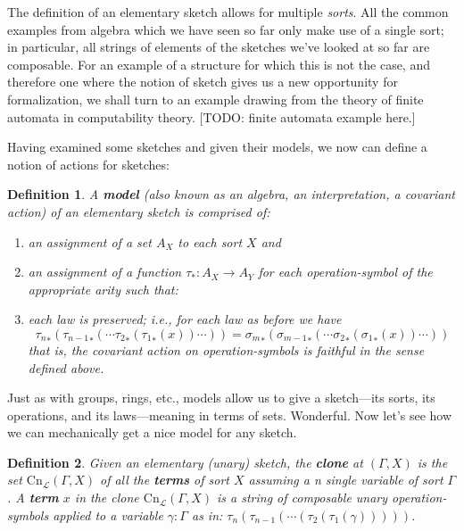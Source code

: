 \documentclass[12pt,twoside]{reedthesis}
\newtheorem{definition}{Definition}
\begin{document}
  The definition of an elementary sketch allows for multiple \emph{sorts}. All
  the common examples from algebra which we have seen so far only make use of a
  single sort; in particular, all strings of elements of the sketches we've
  looked at so far are composable. For an example of a structure for which this
  is not the case, and therefore one where the notion of sketch gives us a new
  opportunity for formalization, we shall turn to an example drawing from the
  theory of finite automata in computability theory. [TODO: finite automata
  example here.]

  Having examined some sketches and given their models, we now can define a
  notion of actions for sketches:
  \begin{definition}
    A \textbf{model} (also known as an algebra, an interpretation, a covariant action) of an elementary sketch is comprised of:
    \begin{enumerate}
      \item an assignment of a set $A_X$ to each sort $X$ and
      \item an assignment of a function $\tau_* : A_X \rightarrow A_Y$ for each operation-symbol of the appropriate arity such that:
      \item each law is preserved; i.e., for each law as before we have
      \[ {\tau_n}_* ({\tau_{n-1}}_* (\cdots {\tau_2}_* ({\tau_1}_* (x))\cdots )) = {\sigma_m}_*  ({\sigma_{m-1}}_*(\cdots {\sigma_2}_* ({\sigma_1}_* (x))\cdots )) \]
      that is, the covariant action on operation-symbols is faithful in the sense defined above.
    \end{enumerate}
  \end{definition}

  Just as with groups, rings, etc., models allow us to give a sketch---its sorts,
  its operations, and its laws---meaning in terms of sets. Wonderful. Now let's
  see how we can mechanically get a nice model for any sketch.

  \begin{definition}
    Given an elementary (unary) sketch, the \textbf{clone} at \( (\Gamma, X) \) is
    the set \( \text{Cn}_\mathcal{L} (\Gamma, X) \) of all the \textbf{terms} of sort
    $X$ assuming a n single variable of sort $\Gamma$. A \textbf{term} $x$ in the
    clone \( \text{Cn}_\mathcal{L} (\Gamma, X) \) is a string of composable unary
    operation-symbols applied to a variable $\gamma : \Gamma$ as in:
    \( \tau_{n} (\tau_{n-1} (\cdots (\tau_{2}(\tau_{1}(\gamma))))) \).
  \end{definition}
\end{document}
